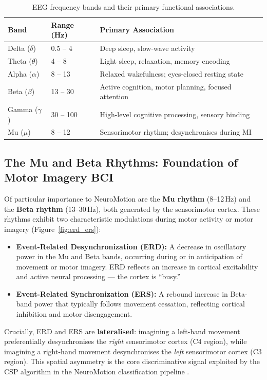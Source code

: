 \documentclass[12pt, a4paper, oneside]{report}
\begin{document}
\begin{table}[h]
\centering
\caption{EEG frequency bands and their primary functional associations.}
\label{tab:brainrhythms}
\begin{tabular}{llp{7cm}}
\toprule
\textbf{Band} & \textbf{Range (Hz)} & \textbf{Primary Association} \\
\midrule
Delta ($\delta$) & 0.5 -- 4   & Deep sleep, slow-wave activity \\
Theta ($\theta$) & 4 -- 8     & Light sleep, relaxation, memory encoding \\
Alpha ($\alpha$) & 8 -- 13    & Relaxed wakefulness; eyes-closed resting state \\
Beta ($\beta$)   & 13 -- 30   & Active cognition, motor planning, focused attention \\
Gamma ($\gamma$) & 30 -- 100  & High-level cognitive processing, sensory binding \\
\midrule
Mu ($\mu$)       & 8 -- 12    & Sensorimotor rhythm; desynchronises during MI \\
\bottomrule
\end{tabular}
\end{table}

\subsection{The Mu and Beta Rhythms: Foundation of Motor Imagery BCI}

Of particular importance to NeuroMotion are the \textbf{Mu rhythm} (8--12\,Hz)
and the \textbf{Beta rhythm} (13--30\,Hz), both generated by the sensorimotor
cortex. These rhythms exhibit two characteristic modulations during motor activity
or motor imagery (Figure~\ref{fig:erd_ers}):

\begin{itemize}
  \item \textbf{Event-Related Desynchronization (ERD):} A decrease in oscillatory
        power in the Mu and Beta bands, occurring during or in anticipation of
        movement or motor imagery. ERD reflects an increase in cortical
        excitability and active neural processing --- the cortex is ``busy.''
  \item \textbf{Event-Related Synchronization (ERS):} A rebound increase in
        Beta-band power that typically follows movement cessation, reflecting
        cortical inhibition and motor disengagement.
\end{itemize}

Crucially, ERD and ERS are \textbf{lateralised}: imagining a left-hand movement
preferentially desynchronises the \textit{right} sensorimotor cortex (C4 region),
while imagining a right-hand movement desynchronises the \textit{left}
sensorimotor cortex (C3 region). This spatial asymmetry is the core discriminative
signal exploited by the CSP algorithm in the NeuroMotion classification pipeline
\cite{pfurtscheller1999}.
\end{document}
